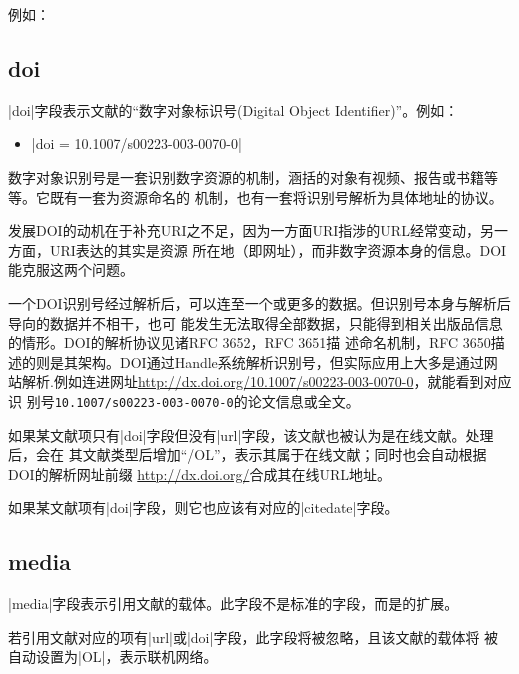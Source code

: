 例如：

\subsection{doi}\label{subsec:bibfield-doi}

|doi|字段表示文献的``数字对象标识号(Digital Object Identifier)''。例如：
\begin{itemize}
\item |doi = {10.1007/s00223-003-0070-0}|
\end{itemize}

数字对象识别号是一套识别数字资源的机制，涵括的对象有视频、报告或书籍等等。它既有一套为资源命名的
机制，也有一套将识别号解析为具体地址的协议。

发展DOI的动机在于补充URI之不足，因为一方面URI指涉的URL经常变动，另一方面，URI表达的其实是资源
所在地（即网址），而非数字资源本身的信息。DOI能克服这两个问题。

一个DOI识别号经过解析后，可以连至一个或更多的数据。但识别号本身与解析后导向的数据并不相干，也可
能发生无法取得全部数据，只能得到相关出版品信息的情形。DOI的解析协议见诸RFC 3652，RFC 3651描
述命名机制，RFC 3650描述的则是其架构。DOI通过Handle系统解析识别号，但实际应用上大多是通过网
站解析.例如连进网址\url{http://dx.doi.org/10.1007/s00223-003-0070-0}，就能看到对应识
别号\texttt{10.1007/s00223-003-0070-0}的论文信息或全文。

如果某文献项只有|doi|字段但没有|url|字段，该文献也被认为是在线文献。{\BibTeX}处理后，会在
其文献类型后增加``/OL''，表示其属于在线文献；同时也会自动根据DOI的解析网址前缀
\url{http://dx.doi.org/}合成其在线URL地址。

如果某文献项有|doi|字段，则它也应该有对应的|citedate|字段。

\subsection{media}\label{subsec:bibfield-media}

|media|字段表示引用文献的载体。此字段不是标准的{\BibTeX}字段，而是{\njuthesis}的扩展。

若引用文献对应的{\BibTeX}项有|url|或|doi|字段，此字段将被忽略，且该文献的载体将
被自动设置为|OL|，表示联机网络。

